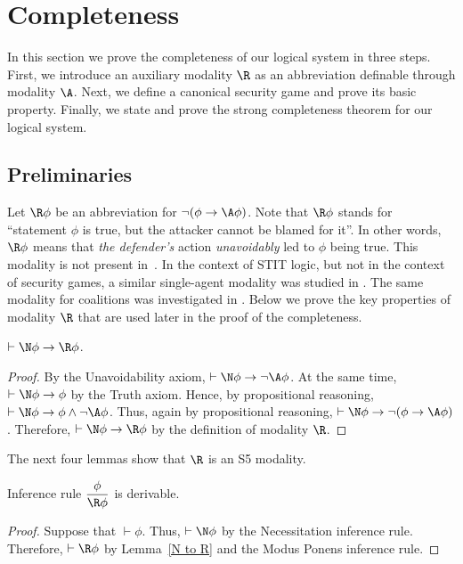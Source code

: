 \documentclass[letterpaper]{article}
\begin{document}
\section{Completeness}

In this section we prove the completeness of our logical system in three steps. First, we introduce an auxiliary modality $\R$ as an abbreviation definable through modality $\A$. Next, we define a canonical security game and prove its basic property. Finally, we state and prove the strong completeness theorem for our logical system.

\subsection{Preliminaries}

Let $\R\phi$ be an abbreviation for $\neg(\phi\to\A\phi)$. Note that $\R\phi$ stands for ``statement $\phi$ is true, but the attacker cannot be blamed for it''. In other words, $\R\phi$ means that {\em the defender's} action {\em unavoidably} led to $\phi$ being true. This modality is not present in~\cite{nt19aaai}. In the context of STIT logic, but not in the context of security games, a similar single-agent modality was studied in \cite{x98jpl}. The same modality for coalitions was investigated in \cite{bht09jancl}.  Below we prove the key properties of modality $\R$ that are used later in the proof of the completeness.


\begin{lemma}\label{N to R}
$\vdash\N\phi\to\R\phi$.
\end{lemma}
\begin{proof}
By the Unavoidability axiom, $\vdash \N\phi\to\neg\A\phi$. At the same time, $\vdash \N\phi\to\phi$ by the Truth axiom. Hence, by propositional reasoning, $\vdash \N\phi\to\phi\wedge\neg\A\phi$. Thus, again by propositional reasoning, $\vdash \N\phi\to\neg(\phi\to\A\phi)$. Therefore, $\vdash\N\phi\to\R\phi$ by the definition of modality $\R$.
\end{proof}

The next four lemmas show that $\R$ is an S5 modality.

\begin{lemma}\label{necessitation rule for R}
Inference rule $\dfrac{\phi}{\R\phi}$ is derivable.
\end{lemma}
\begin{proof}
Suppose that $\vdash\phi$. Thus, $\vdash\N\phi$ by the Necessitation inference rule. Therefore, $\vdash\R\phi$ by Lemma~\ref{N to R} and the Modus Ponens inference rule.
\end{proof}
\end{document}
